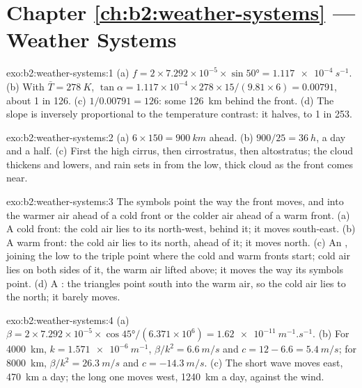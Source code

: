 \section*{Chapter \ref{ch:b2:weather-systems} --- Weather Systems}

\begin{solution}{exo:b2:weather-systems:1}
(a) $f = 2 \times 7.292 \times 10^{-5} \times \sin\ang{50} = \qty{1.117e-4}{s^{-1}}$. (b) With
$\bar T = \qty{278}{K}$, $\tan\alpha = 1.117 \times 10^{-4} \times 278 \times 15/(9.81 \times 6)
= 0.00791$, about 1 in 126. (c) $1/0.00791 = 126$: some \qty{126}{km} behind the front. (d) The
slope is inversely proportional to the temperature contrast: it halves, to 1 in 253.
\end{solution}

\begin{solution}{exo:b2:weather-systems:2}
(a) $6 \times 150 = \qty{900}{km}$ ahead. (b) $900/25 = \qty{36}{h}$, a day and a half. (c) First
the high cirrus, then cirrostratus, then altostratus; the cloud thickens and lowers, and rain
sets in from the low, thick cloud as the front comes near.
\end{solution}

\begin{solution}{exo:b2:weather-systems:3}
The symbols point the way the front moves, and into the warmer air ahead of a cold front or the
colder air ahead of a warm front. (a) A cold front: the cold air lies to its north-west, behind
it; it moves south-east. (b) A warm front: the cold air lies to its north, ahead of it; it moves
north. (c) An , joining the low to the triple point where the cold and warm
fronts start; cold air lies on both sides of it, the warm air lifted above; it moves the way its
symbols point. (d) A : the triangles point south into the warm air, so the cold
air lies to the north; it barely moves.
\end{solution}

\begin{solution}{exo:b2:weather-systems:4}
(a) $\beta = 2 \times 7.292 \times 10^{-5} \times \cos\ang{45}/(6.371 \times 10^6) =
\qty{1.62e-11}{m^{-1}.s^{-1}}$. (b) For \qty{4000}{km}, $k = \qty{1.571e-6}{m^{-1}}$, $\beta/k^2 =
\qty{6.6}{m/s}$ and $c = 12 - 6.6 = \qty{5.4}{m/s}$; for \qty{8000}{km}, $\beta/k^2 =
\qty{26.3}{m/s}$ and $c = \qty{-14.3}{m/s}$. (c) The short wave moves east, \qty{470}{km} a day;
the long one moves west, \qty{1240}{km} a day, against the wind.
\end{solution}

